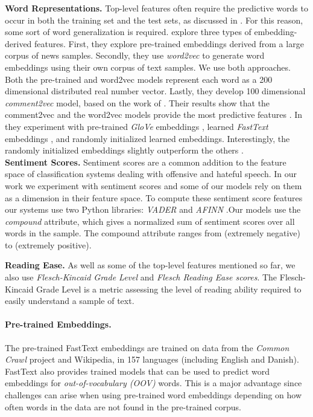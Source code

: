 \documentclass{article}
\begin{document}
\textbf{Word Representations.} Top-level features often require the predictive words to occur in both the training set and the test sets, as discussed in \cite{schmidt2017survey}. For this reason, some sort of word generalization is required. \cite{nobata2016abusive} explore three types of embedding-derived features. First, they explore pre-trained embeddings derived from a large corpus of news samples. Secondly, they use \textit{word2vec} \cite{word2vec} to generate word embeddings using their own corpus of text samples. We use both approaches. Both the pre-trained and word2vec models represent each word as a 200 dimensional distributed real number vector. Lastly, they develop 100 dimensional \textit{comment2vec} model, based on the work of \cite{le2014distributed}. Their results show that the comment2vec and the word2vec models provide the most predictive features \cite{nobata2016abusive}. In \cite{badjatiya2017deep} they experiment with pre-trained \textit{GloVe} embeddings \cite{glove}, learned \textit{FastText} embeddings \cite{fasttext}, and randomly initialized learned embeddings. Interestingly, the randomly initialized embeddings slightly outperform the others \cite{badjatiya2017deep}.\\ 

\textbf{Sentiment Scores.}\label{ssec:semanticScores}
Sentiment scores are a common addition to the feature space of classification systems dealing with offensive and hateful speech. In our work we experiment with sentiment scores and some of our models rely on them as a dimension in their feature space. To compute these sentiment score features our systems use two Python libraries: \textit{VADER} \cite{hutto2014vader} and \textit{AFINN} \cite{nielsen2011Afinn}.Our models use the \textit{compound} attribute, which gives a normalized sum of sentiment scores over all words in the sample. The compound attribute ranges from  (extremely negative) to  (extremely positive). 

\textbf{Reading Ease.}\label{ssec:linguisticFeatures}
As well as some of the top-level features mentioned so far, we also use \textit{Flesch-Kincaid Grade Level} and \textit{Flesch Reading Ease scores}. The Flesch-Kincaid Grade Level is a metric assessing the level of reading ability required to easily understand a sample of text.


\paragraph{Pre-trained Embeddings.} The pre-trained FastText \cite{fasttext} embeddings are trained on data from the \textit{Common Crawl} project and Wikipedia, in 157 languages (including English and Danish).  FastText also provides trained models that can be used to predict word embeddings for \textit{out-of-vocabulary (OOV)} words. This is a major advantage since  challenges can arise when using pre-trained word embeddings depending on how often words in the data are not found in the pre-trained corpus. 
\end{document}
